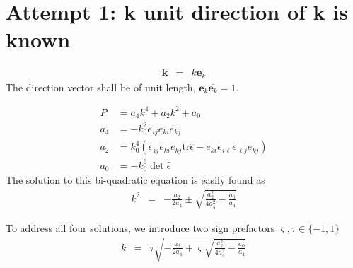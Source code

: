 \documentclass[12pt,a4paper,twoside,openright,BCOR10mm,headsepline,titlepage,abstracton,chapterprefix,final]{scrreprt}
\newcommand\Vector[1]{{\mathbf{#1}}}
\newcommand\wavenumber{k}
\newcommand\Wavevector{\Vector{\wavenumber}}
\newcommand\Tensor[1]{\hat{#1}}
\newcommand\scalarrelativepermittivity{\epsilon}
\newcommand\relativepermittivity{\Tensor{\scalarrelativepermittivity}}
\begin{document}
\section{Attempt 1: k unit direction of k is known}

\begin{eqnarray}
 \Wavevector &=& \wavenumber \Vector{e}_\wavenumber
\end{eqnarray}
The direction vector shall be of unit length, $\Vector{e}_\wavenumber \overline{\Vector{e}_\wavenumber} = 1$.

\begin{align}
 P &= a_4 \wavenumber^4 + a_2 \wavenumber^2 + a_0
 \\
 a_4 &= - k_0^2 \scalarrelativepermittivity_{\,ij} e_{ki} e_{kj}
 \\
 a_2 &=   k_0^4 ( \scalarrelativepermittivity_{\,ij} e_{ki} e_{kj} \text{tr}\relativepermittivity - e_{ki} \scalarrelativepermittivity_{\,i\ell} \scalarrelativepermittivity_{\,\ell j} e_{kj})
 \\
 a_0 &= - k_0^6 \det \relativepermittivity
\end{align}
The solution to this bi-quadratic equation is easily found as
\begin{eqnarray}
 \wavenumber^2 &=& - \frac{a_2}{2 a_4} \pm \sqrt{\frac{a_2^2}{4 a_4^2} - \frac{a_0}{a_4}} 
\end{eqnarray}

To address all four solutions, we introduce two sign prefactors $\varsigma, \tau \in \{ -1,1\}$
\begin{eqnarray}
 \wavenumber &=& \tau \sqrt{ - \frac{a_2}{2 a_4} + \varsigma \sqrt{\frac{a_2^2}{4 a_4^2} - \frac{a_0}{a_4}} } \label{eq:dispersion_for_known_direction}
\end{eqnarray}
\end{document}

